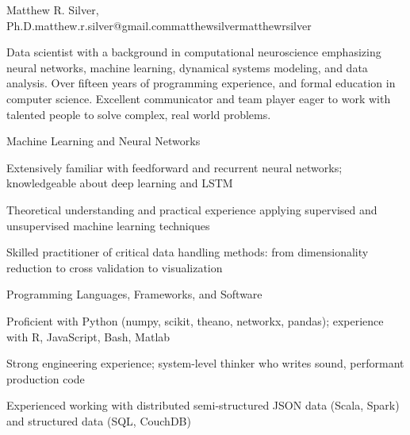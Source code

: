 \documentclass{report}
\begin{document}

  \begin{resume_header}{Matthew R. Silver, Ph.D.}{matthew.r.silver@gmail.com}{}{matthewsilver}{matthewrsilver}

    Data scientist with a background in computational neuroscience emphasizing neural networks, machine learning, dynamical systems modeling, and data analysis. Over fifteen years of programming experience, and formal education in computer science. Excellent communicator and team player eager to work with talented people to solve complex, real world problems.

  \end{resume_header}





  \begin{skillset}{Machine Learning and Neural Networks}
    \item Extensively familiar with feedforward and recurrent neural networks; knowledgeable about deep learning and LSTM
    \item Theoretical understanding and practical experience applying supervised and unsupervised machine learning techniques
    \item Skilled practitioner of critical data handling methods: from dimensionality reduction to cross validation to visualization
  \end{skillset}

  \begin{skillset}{Programming Languages, Frameworks, and Software}
    \item Proficient with Python (numpy, scikit, theano, networkx, pandas); experience with R, JavaScript, Bash, Matlab
    \item Strong \CC{} engineering experience; system-level thinker who writes sound, performant production code
    \item Experienced working with distributed semi-structured JSON data (Scala, Spark) and structured data (SQL, CouchDB)
  \end{skillset}




\end{document}
